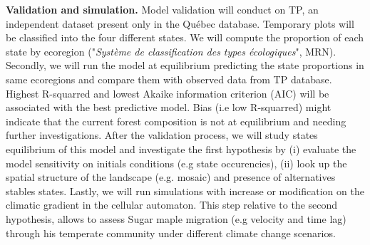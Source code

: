 \textbf{Validation and simulation.} Model validation will conduct on TP, an
independent dataset present only in the Québec database. Temporary plots will
be classified into the four different states. We will compute the proportion
of each state by ecoregion ("\textit{Système de classification des types
écologiques}", MRN). Secondly, we will run the model at equilibrium predicting
the state proportions in same ecoregions and compare them with observed data
from TP database. Highest R-squarred and lowest Akaike information criterion
(AIC) will be associated with the best predictive model. Bias (i.e low
R-squarred) might indicate that the current forest composition is not at
equilibrium and needing further investigations. After the validation process,
we will study states equilibrium of this model and investigate the first
hypothesis by (i) evaluate the model sensitivity on initials conditions (e.g
state occurencies), (ii) look up the spatial structure of the landscape (e.g.
mosaic) and presence of alternatives stables states. Lastly, we will run
simulations with increase or modification on the climatic gradient in the
cellular automaton. This step relative to the second hypothesis, allows to
assess Sugar maple migration (e.g velocity and time lag) through his
temperate community under different climate change scenarios.


\clearpage
\small

